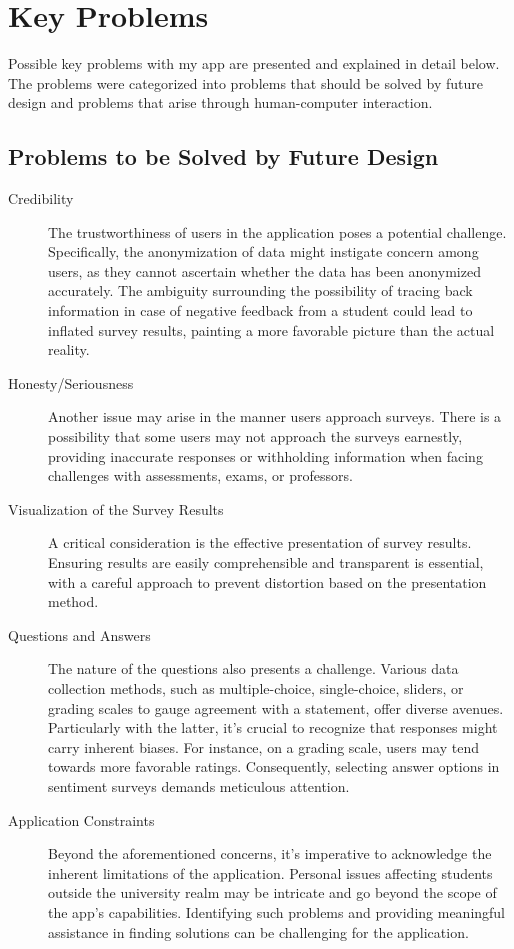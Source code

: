 \section{Key Problems}

Possible key problems with my app are presented and explained in detail below. The problems were categorized into problems that should be solved by future design and problems that arise through human-computer interaction.

\subsection{Problems to be Solved by Future Design}

\begin{description}

    \item[Credibility] The trustworthiness of users in the application poses a potential challenge. Specifically, the anonymization of data might instigate concern among users, as they cannot ascertain whether the data has been anonymized accurately. The ambiguity surrounding the possibility of tracing back information in case of negative feedback from a student could lead to inflated survey results, painting a more favorable picture than the actual reality.
    
    \item[Honesty/Seriousness] Another issue may arise in the manner users approach surveys. There is a possibility that some users may not approach the surveys earnestly, providing inaccurate responses or withholding information when facing challenges with assessments, exams, or professors.
    
    \item[Visualization of the Survey Results] A critical consideration is the effective presentation of survey results. Ensuring results are easily comprehensible and transparent is essential, with a careful approach to prevent distortion based on the presentation method. 
    
    \item[Questions and Answers] The nature of the questions also presents a challenge. Various data collection methods, such as multiple-choice, single-choice, sliders, or grading scales to gauge agreement with a statement, offer diverse avenues. Particularly with the latter, it's crucial to recognize that responses might carry inherent biases. For instance, on a grading scale, users may tend towards more favorable ratings. Consequently, selecting answer options in sentiment surveys demands meticulous attention. 
    
    \item[Application Constraints] Beyond the aforementioned concerns, it's imperative to acknowledge the inherent limitations of the application. Personal issues affecting students outside the university realm may be intricate and go beyond the scope of the app's capabilities. Identifying such problems and providing meaningful assistance in finding solutions can be challenging for the application.
    
\end{description}

